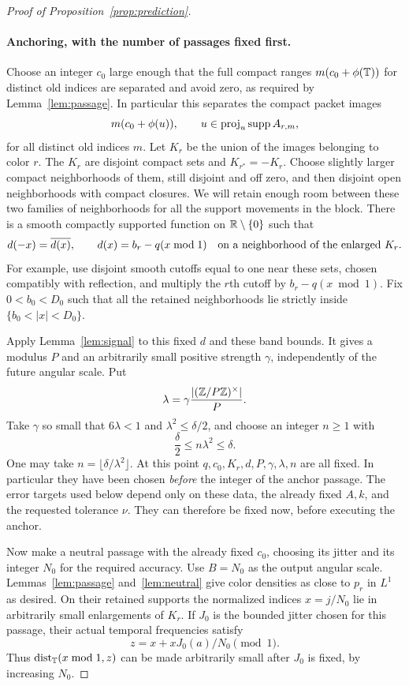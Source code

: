 \begin{proof}[Proof of Proposition~\ref{prop:prediction}]
\paragraph{Anchoring, with the number of passages fixed first.}
Choose an integer $c_0$ large enough that the full compact ranges
$m(c_0+\phi(\mathbb T))$ for distinct old indices are separated and avoid
zero, as required by Lemma~\ref{lem:passage}.  In particular this
separates the compact packet images
\[
 m(c_0+\phi(u)),\qquad
 u\in\operatorname{proj}_u\operatorname{supp} A_{r,m},
\]
for all distinct old indices $m$.  Let $K_r$ be the union of the
images belonging to color $r$.
The $K_r$ are disjoint compact sets and
$K_{r^*}=-K_r$.  Choose slightly larger compact neighborhoods of them,
still disjoint and off zero, and then disjoint open neighborhoods with
compact closures.  We will retain enough room between these two
families of neighborhoods for all the support movements in the block.
There is a smooth compactly supported function on $\mathbb R\setminus\{0\}$
such that
\begin{equation}
 d(-x)=\overline{d(x)},\qquad
 d(x)=b_r-q(x\bmod1)
 \quad\hbox{on a neighborhood of the enlarged }K_r.
 \label{eq:block-band-function}
\end{equation}
For example, use disjoint smooth cutoffs equal to one near these sets,
chosen compatibly with reflection, and multiply the $r$th cutoff by
$b_r-q(x\bmod1)$.  Fix $0<b_0<D_0$ such that all the retained
neighborhoods lie strictly inside $\{b_0<|x|<D_0\}$.

Apply Lemma~\ref{lem:signal} to this fixed $d$ and these band bounds.
It gives a modulus $P$ and an arbitrarily small positive strength
$\gamma$, independently of the future angular scale.  Put
\[
 \lambda=\gamma\frac{|(\mathbb Z/P\mathbb Z)^\times|}{P}.
\]
Take $\gamma$ so small that $6\lambda<1$ and $\lambda^2\le\delta/2$,
and choose an integer $n\ge1$ with
\begin{equation}
 \frac\delta2\le n\lambda^2\le\delta.
 \label{eq:block-budget}
\end{equation}
One may take $n=\lfloor\delta/\lambda^2\rfloor$.
At this point $q,c_0,K_r,d,P,\gamma,\lambda,n$ are all fixed.
In particular they have been chosen \emph{before} the integer of the
anchor passage.  The error targets used below depend only on these
data, the already fixed $A,k$, and the requested tolerance $\nu$.
They can therefore be fixed now, before executing the anchor.

Now make a neutral passage with the already fixed $c_0$, choosing its
jitter and its integer $N_0$ for the required accuracy.  Use
$B=N_0$ as the output angular scale.  Lemmas~\ref{lem:passage}
and~\ref{lem:neutral} give color densities as close to $p_r$ in
$L^1$ as desired.  On their retained supports the normalized indices
$x=j/N_0$ lie in arbitrarily small enlargements of $K_r$.  If $J_0$
is the bounded jitter chosen for this passage, their actual temporal
frequencies satisfy
\[
 z=x+xJ_0(a)/N_0\pmod1.
\]
Thus $\operatorname{dist}_{\mathbb T}(x\bmod1,z)$ can be made arbitrarily small after
$J_0$ is fixed, by increasing $N_0$.


\end{proof}
